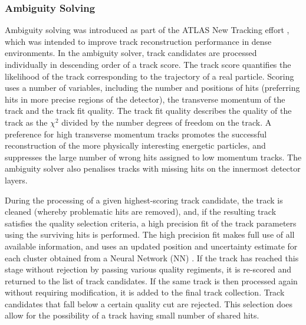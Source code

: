 \subsubsection{Ambiguity Solving}
Ambiguity solving was introduced as part of the ATLAS New Tracking effort \cite{Cornelissen:2007vba}, which was intended to improve track reconstruction performance in dense environments.
In the ambiguity solver, track candidates are processed individually in descending order of a track score. The track score quantifies the likelihood of the track corresponding to the trajectory of a real particle. Scoring uses a number of variables, including the number and positions of hits (preferring hits in more precise regions of the detector), the transverse momentum of the track and the track fit quality. The track fit quality describes the quality of the track as the $\chi^2$ divided by the number degrees of freedom on the track. A preference for high transverse momentum tracks promotes the successful reconstruction of the more physically interesting energetic particles, and suppresses the large number of wrong hits assigned to low momentum tracks.
The ambiguity solver also penalises tracks with missing hits on the innermost detector layers. 

During the processing of a given highest-scoring track candidate, the track is cleaned (whereby problematic hits are removed), and, if the resulting track satisfies the quality selection criteria, a high precision fit of the track parameters using the surviving hits is performed.
The high precision fit makes full use of all available information, and uses an updated position and uncertainty estimate for each cluster obtained from a Neural Network (NN) \cite{PERF-2012-05}.
If the track has reached this stage without rejection by passing various quality regiments, it is re-scored and returned to the list of track candidates.
If the same track is then processed again without requiring modification, it is added to the final track collection.
Track candidates that fall below a certain quality cut are rejected.
This selection does allow for the possibility of a track having small number of shared hits.

